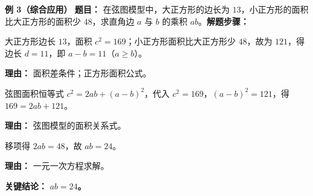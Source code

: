 \begin{examplebox}
	\medskip
	\textbf{\textcolor{CExample}{例 3（综合应用）}}
	\textbf{\textcolor{CExample}{题目：}} 在弦图模型中，大正方形的边长为 $13$，小正方形的面积比大正方形的面积少 $48$，求直角边 $a$ 与 $b$ 的乘积 $ab$。\textbf{\textcolor{CExample}{解题步骤：}}
	\begin{description}[style=nextline, leftmargin=2.8em, labelsep=0.5em, itemsep=0.45em]
		\item[\textbf{第一步（求小正方形面积）：}]
			大正方形边长 $13$，面积 $c^2=169$；小正方形面积比大正方形少 $48$，故为 $121$，得边长 $d=11$，即 $a-b=11$（$a\ge b$）。
			\par\textbf{理由：} 面积差条件；正方形面积公式。
		\item[\textbf{第二步（应用弦图关系）：}]
			弦图面积恒等式 $c^2 = 2ab + (a-b)^2$，代入 $c^2=169$，$(a-b)^2=121$，得 $169 = 2ab + 121$。
			\par\textbf{理由：} 弦图模型的面积关系式。
		\item[\textbf{第三步（解出乘积）：}]
			移项得 $2ab = 48$，故 $ab = 24$。
			\par\textbf{理由：} 一元一次方程求解。
	\end{description}
	\textbf{\textcolor{CExample}{关键结论：}}
	\textbf{$ab=24$。}
\end{examplebox}
